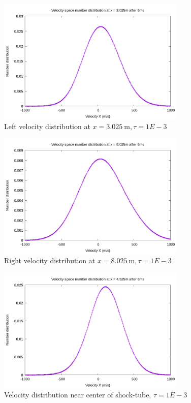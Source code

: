 \documentclass[paper=a4, fontsize=12pt]{scrartcl}
\begin{document}
\begin{figure}[H]
        \centering
        \includegraphics[width=0.8\textwidth]{left_f}
        \caption{Left velocity distribution at $x = \SI{3.025}{\meter}, \tau = 1E-3$ }
        \label{fig:left_f}
\end{figure}
\begin{figure}[H]
        \centering
        \includegraphics[width=0.8\textwidth]{right_f}
        \caption{Right velocity distribution at $x = \SI{8.025}{\meter}, \tau = 1E-3$ }
        \label{fig:right_f}
\end{figure}
\begin{figure}[H]
        \centering
        \includegraphics[width=0.8\textwidth]{center_shock}
        \caption{Velocity distribution near center of shock-tube, $\tau = 1E-3$}
        \label{fig:center_shock}
\end{figure}
\end{document}
